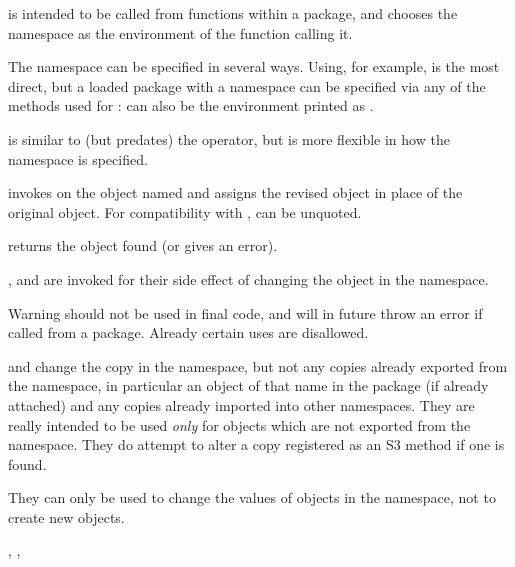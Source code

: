 %
\begin{Details}\relax
{} is intended to be called from functions
within a package, and chooses the namespace as the environment of the
function calling it.

The namespace can be specified in several ways.  Using, for example,
 is the most direct, but a loaded package with a
namespace can be specified via any of the methods used for
:  can also be the environment printed as
.

 is similar to (but predates) the
\code{\LinkA{:::}{:::}} operator, but is more flexible in how the namespace
is specified.

 invokes  on the object named
 and assigns the revised object in place of the original
object.  For compatibility with ,  can be unquoted.
\end{Details}
%
\begin{Value}
 returns the object found (or gives an error).

,  and
 are invoked for their side effect of changing
the object in the namespace.
\end{Value}
%
\begin{Section}{Warning}
 should not be used in final code, and will in
future throw an error if called from a package.  Already certain uses
are disallowed.
\end{Section}
%
\begin{Note}\relax
{} and  change the copy in
the namespace, but not any copies already exported from the namespace,
in particular an object of that name in the package (if already
attached) and any copies already imported into other namespaces.
They are really intended to be used \emph{only} for objects which are
not exported from the namespace.  They do attempt to alter a copy
registered as an S3 method if one is found.

They can only be used to change the values of objects in the
namespace, not to create new objects.
\end{Note}
%
\begin{SeeAlso}\relax
{}, , 
\end{SeeAlso}
